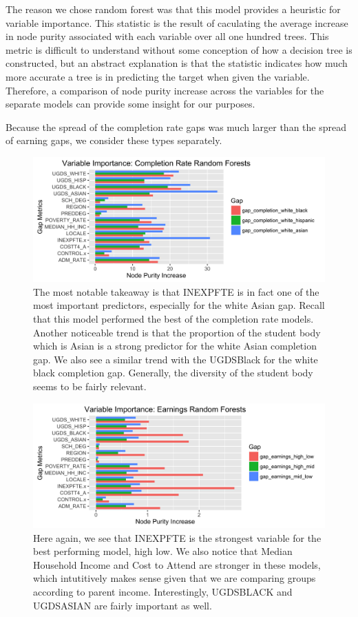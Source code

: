 \documentclass{article}
\begin{document}
The reason we chose random forest was that this model provides a heuristic for variable importance. This statistic is the result of caculating the average increase in node purity associated with each variable over all one hundred trees. This metric is difficult to understand without some conception of how a decision tree is constructed, but an abstract explanation is that the statistic indicates how much more accurate a tree is in predicting the target when given the variable. Therefore, a comparison of node purity increase across the variables for the separate models can provide some insight for our purposes.

Because the spread of the completion rate gaps was much larger than the spread of earning gaps, we consider these types separately.


\begin{figure}[H]
\centering
\includegraphics[width=1\textwidth]{../images/rf_importance_completion.png}
\caption{\label{fig: RFCompletionRates} The most notable takeaway is that INEXPFTE is in fact one of the most important predictors, especially for the white Asian gap. Recall that this model performed the best of the completion rate models. Another noticeable trend is that the proportion of the student body which is Asian is a strong predictor for the white Asian completion gap. We also see a similar trend with the UGDSBlack for the white black completion gap. Generally, the diversity of the student body seems to be fairly relevant.}
\end{figure}


\begin{figure}[H]
\centering
\includegraphics[width=1\textwidth]{../images/rf_importance_earnings.png}
\caption{\label{fig: EarningsRFImportance} Here again, we see that INEXPFTE is the strongest variable for the best performing model, high low. We also notice that Median Household Income and Cost to Attend are stronger in these models, which intutitively makes sense given that we are comparing groups according to parent income. Interestingly, UGDSBLACK and UGDSASIAN are fairly important as well.}
\end{figure}
\end{document}
